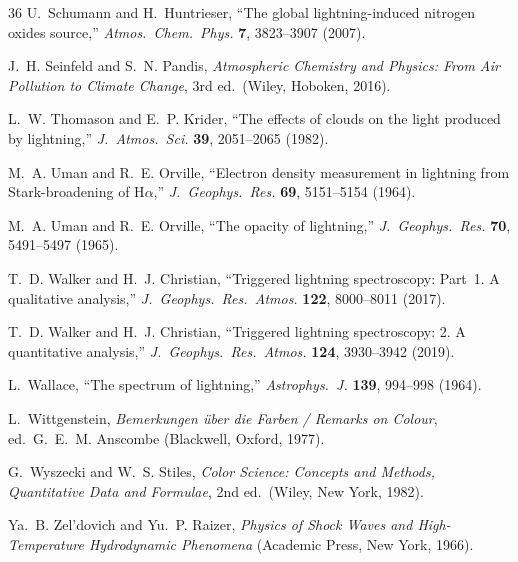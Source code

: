 \documentclass[11pt,a4paper]{article}
\begin{document}
\begin{thebibliography}{36}
U.~Schumann and H.~Huntrieser, ``The global lightning-induced nitrogen
oxides source,'' \emph{Atmos.\ Chem.\ Phys.} \textbf{7}, 3823--3907 (2007).

J.~H. Seinfeld and S.~N. Pandis, \emph{Atmospheric Chemistry and Physics:
From Air Pollution to Climate Change}, 3rd ed.\ (Wiley, Hoboken, 2016).

L.~W. Thomason and E.~P. Krider, ``The effects of clouds on the light
produced by lightning,'' \emph{J.\ Atmos.\ Sci.} \textbf{39}, 2051--2065
(1982).

M.~A. Uman and R.~E. Orville, ``Electron density measurement in lightning
from Stark-broadening of H$\alpha$,'' \emph{J.\ Geophys.\ Res.}
\textbf{69}, 5151--5154 (1964).

M.~A. Uman and R.~E. Orville, ``The opacity of lightning,'' \emph{J.\
Geophys.\ Res.} \textbf{70}, 5491--5497 (1965).

T.~D. Walker and H.~J. Christian, ``Triggered lightning spectroscopy: Part~1.
A qualitative analysis,'' \emph{J.\ Geophys.\ Res.\ Atmos.} \textbf{122},
8000--8011 (2017).

T.~D. Walker and H.~J. Christian, ``Triggered lightning spectroscopy: 2. A
quantitative analysis,'' \emph{J.\ Geophys.\ Res.\ Atmos.} \textbf{124},
3930--3942 (2019).

L.~Wallace, ``The spectrum of lightning,'' \emph{Astrophys.\ J.}
\textbf{139}, 994--998 (1964).

L.~Wittgenstein, \emph{Bemerkungen \"uber die Farben / Remarks on Colour},
ed.\ G.~E.~M. Anscombe (Blackwell, Oxford, 1977).

G.~Wyszecki and W.~S. Stiles, \emph{Color Science: Concepts and Methods,
Quantitative Data and Formulae}, 2nd ed.\ (Wiley, New York, 1982).

Ya.~B. Zel'dovich and Yu.~P. Raizer, \emph{Physics of Shock Waves and
High-Temperature Hydrodynamic Phenomena} (Academic Press, New York, 1966).

\end{thebibliography}
\end{document}
